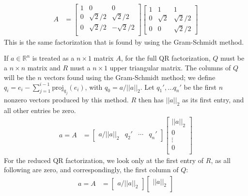 \documentclass{article}
\begin{document}
\begin{align*}
    A & = \begin{bmatrix}
        1 & 0 & 0 \\
        0 & \sqrt{2}/2 & \sqrt{2}/2 \\
        0 & \sqrt{2}/2 & -\sqrt{2}/2 \\
    \end{bmatrix}\begin{bmatrix}
        1 & 1 & 1 \\
        0 & \sqrt{2} & \sqrt{2}/2 \\
        0 & 0 & \sqrt{2}/2
    \end{bmatrix}
\end{align*}
This is the same factorization that is found by using the Gram-Schmidt method.

\clearpage
\problem{}
If $a \in \mathbb{R}^n$ is treated as a $n \times 1$ matrix $A$, for the full QR factorization, $Q$ must be a $n \times n$ matrix and $R$ must a $n \times 1$ upper triangular matrix. The columns of $Q$ will be the $n$ vectors found using the Gram-Schmidt method; we define $q_i = e_i - \sum_{j=1}^{i - 1} \mathrm{proj}_{q_j}(e_i)$, with $q_0 = a/||a||_2$. Let $q_1', \ldots q_n'$ be the first $n$ nonzero vectors produced by this method. $R$ then has $||a||_2$ as its first entry, and all other entries be zero.
\begin{align*}
    a = A & = \begin{bmatrix}
        a/||a||_2 & q_2' & \cdots & q_n'
    \end{bmatrix}\begin{bmatrix}
        ||a||_2 \\
        0 \\
        \vdots \\
        0 \\
    \end{bmatrix}
\end{align*}
For the reduced QR factorization, we look only at the first entry of $R$, as all following are zero, and correspondingly, the first column of $Q$:
\begin{align*}
    a = A & = \begin{bmatrix}
        a/||a||_2
    \end{bmatrix}\begin{bmatrix}
        ||a||_2 \\
    \end{bmatrix}
\end{align*}
\end{document}
